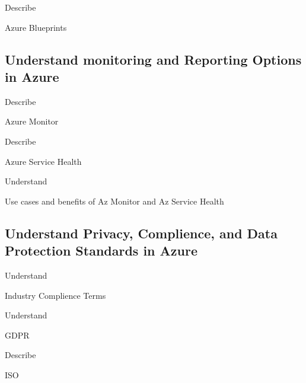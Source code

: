 \documentclass{scrartcl}
\newenvironment{flashcard}[2][]{%
    #1
    \vfill
    \centerline{\Large{#2}}
    \vfill
    \newpage
}
{\newpage}
\newcommand{\subsectioncard}[1]{
    \vspace*{\stretch{1}}
    \subsection{#1}
    \vspace*{\stretch{1}}
    \pagebreak
}
\begin{document}
    \begin{flashcard}[Describe]{Azure Blueprints}

    \end{flashcard}

    \subsectioncard{Understand monitoring and Reporting Options in Azure}

    \begin{flashcard}[Describe]{Azure Monitor}

    \end{flashcard}

    \begin{flashcard}[Describe]{Azure Service Health}

    \end{flashcard}

    \begin{flashcard}[Understand]{Use cases and benefits of Az Monitor and Az Service Health}

    \end{flashcard}

    \subsectioncard{Understand Privacy, Complience, and Data Protection Standards in Azure}

    \begin{flashcard}[Understand]{Industry Complience Terms}

    \end{flashcard}

    \begin{flashcard}[Understand]{GDPR}

    \end{flashcard}

    \begin{flashcard}[Describe]{ISO}

    \end{flashcard}
\end{document}
